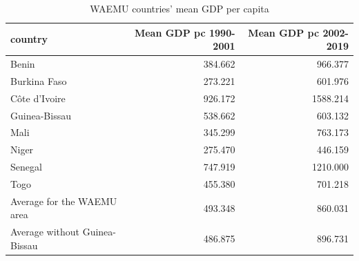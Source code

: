 \begin{table}

\caption{WAEMU countries' mean GDP per capita}
\centering
\begin{tabular}[t]{lrr}
\toprule
country & Mean GDP pc 1990-2001 & Mean GDP pc 2002-2019\\
\midrule
Benin & 384.662 & 966.377\\
Burkina Faso & 273.221 & 601.976\\
Côte d'Ivoire & 926.172 & 1588.214\\
Guinea-Bissau & 538.662 & 603.132\\
Mali & 345.299 & 763.173\\
\addlinespace
Niger & 275.470 & 446.159\\
Senegal & 747.919 & 1210.000\\
Togo & 455.380 & 701.218\\
Average for the WAEMU area & 493.348 & 860.031\\
Average without Guinea-Bissau & 486.875 & 896.731\\
\bottomrule
\end{tabular}
\end{table}